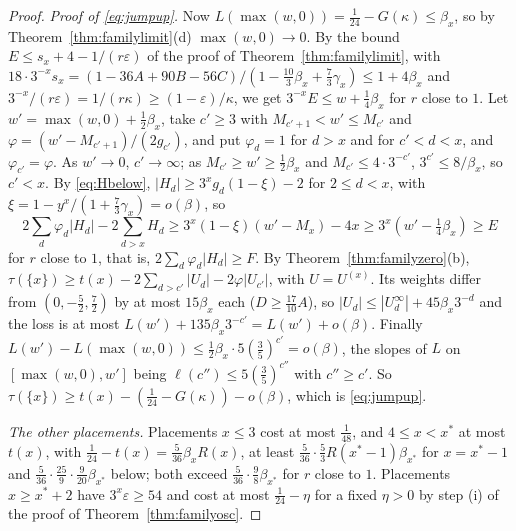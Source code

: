 \documentclass[11pt]{article}
\begin{document}
\begin{proof}
\emph{Proof of \eqref{eq:jumpup}.}  Now $L(\max(w,0))=\tfrac1{24}-G(\kappa)\le\beta_x$,
so by Theorem~\ref{thm:familylimit}(d) $\max(w,0)\to0$.  By the bound
$E\le s_x+4-1/(r\varepsilon)$ of the proof of
Theorem~\ref{thm:familylimit}, with
$18\cdot3^{-x}s_x=(1-36A+90B-56C)/(1-\tfrac{10}3\beta_x+\tfrac73\gamma_x)\le1+4\beta_x$
and $3^{-x}/(r\varepsilon)=1/(r\kappa)\ge(1-\varepsilon)/\kappa$, we get
$3^{-x}E\le w+\tfrac14\beta_x$ for $r$ close to $1$.  Let
$w'=\max(w,0)+\tfrac12\beta_x$, take $c'\ge3$ with $M_{c'+1}<w'\le M_{c'}$
and $\varphi=(w'-M_{c'+1})/(2g_{c'})$, and put $\varphi_d=1$ for $d>x$ and
for $c'<d<x$, and $\varphi_{c'}=\varphi$.  As $w'\to0$, $c'\to\infty$; as
$M_{c'}\ge w'\ge\tfrac12\beta_x$ and $M_{c'}\le4\cdot3^{-c'}$,
$3^{c'}\le8/\beta_x$, so $c'<x$.  By \eqref{eq:Hbelow},
$|H_d|\ge3^xg_d(1-\xi)-2$ for $2\le d<x$, with
$\xi=1-y^x/(1+\tfrac73\gamma_x)=o(\beta)$, so
\[
  2\sum_d\varphi_d|H_d|-2\sum_{d>x}H_d
  \ge3^x(1-\xi)(w'-M_x)-4x\ge3^x(w'-\tfrac14\beta_x)\ge E
\]
for $r$ close to $1$, that is, $2\sum_d\varphi_d|H_d|\ge F$.  By
Theorem~\ref{thm:familyzero}(b),
$\tau(\{x\})\ge t(x)-2\sum_{d>c'}|U_d|-2\varphi|U_{c'}|$, with
$U=U^{(x)}$.  Its weights differ from $(0,-\tfrac52,\tfrac72)$ by at most
$15\beta_x$ each ($D\ge\tfrac{17}{10}A$), so
$|U_d|\le|U^\infty_d|+45\beta_x3^{-d}$ and the loss is at most
$L(w')+135\beta_x3^{-c'}=L(w')+o(\beta)$.  Finally
$L(w')-L(\max(w,0))\le\tfrac12\beta_x\cdot5(\tfrac35)^{c'}=o(\beta)$, the
slopes of $L$ on $[\max(w,0),w']$ being $\ell(c'')\le5(\tfrac35)^{c''}$ with
$c''\ge c'$.  So
$\tau(\{x\})\ge t(x)-(\tfrac1{24}-G(\kappa))-o(\beta)$, which is
\eqref{eq:jumpup}.

\emph{The other placements.}  Placements $x\le3$ cost at most
$\tfrac1{48}$, and $4\le x<x^*$ at most $t(x)$, with
$\tfrac1{24}-t(x)=\tfrac5{36}\beta_xR(x)$, at least
$\tfrac5{36}\cdot\tfrac53R(x^*-1)\beta_{x^*}$ for $x=x^*-1$ and
$\tfrac5{36}\cdot\tfrac{25}9\cdot\tfrac9{20}\beta_{x^*}$ below; both exceed
$\tfrac5{36}\cdot\tfrac98\beta_{x^*}$ for $r$ close to $1$.  Placements
$x\ge x^*+2$ have $3^x\varepsilon\ge54$ and cost at most
$\tfrac1{24}-\eta$ for a fixed $\eta>0$ by step (i) of the proof of
Theorem~\ref{thm:familyosc}.


\end{proof}
\end{document}
